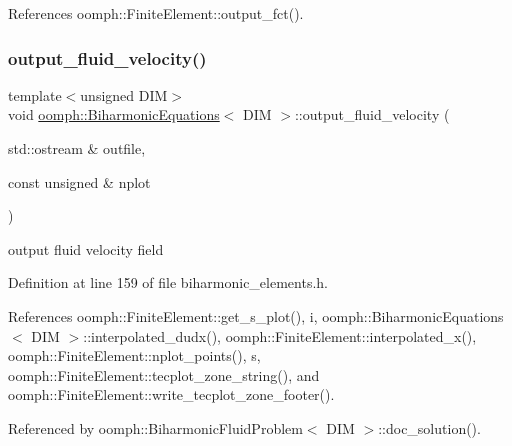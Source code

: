 References oomph\+::\+Finite\+Element\+::output\+\_\+fct().

\mbox{\label{classoomph_1_1BiharmonicEquations_a1aa52e23ab7e609c21d97728e9a8f2ce}} 
\subsubsection{\texorpdfstring{output\+\_\+fluid\+\_\+velocity()}{output\_fluid\_velocity()}}
{\footnotesize\ttfamily template$<$unsigned D\+IM$>$ \\
void \hyperlink{classoomph_1_1BiharmonicEquations}{oomph\+::\+Biharmonic\+Equations}$<$ D\+IM $>$\+::output\+\_\+fluid\+\_\+velocity (\begin{DoxyParamCaption}\item[{std\+::ostream \&}]{outfile,  }\item[{const unsigned \&}]{nplot }\end{DoxyParamCaption})\hspace{0.3cm}{\ttfamily [inline]}}



output fluid velocity field 



Definition at line 159 of file biharmonic\+\_\+elements.\+h.



References oomph\+::\+Finite\+Element\+::get\+\_\+s\+\_\+plot(), i, oomph\+::\+Biharmonic\+Equations$<$ D\+I\+M $>$\+::interpolated\+\_\+dudx(), oomph\+::\+Finite\+Element\+::interpolated\+\_\+x(), oomph\+::\+Finite\+Element\+::nplot\+\_\+points(), s, oomph\+::\+Finite\+Element\+::tecplot\+\_\+zone\+\_\+string(), and oomph\+::\+Finite\+Element\+::write\+\_\+tecplot\+\_\+zone\+\_\+footer().



Referenced by oomph\+::\+Biharmonic\+Fluid\+Problem$<$ D\+I\+M $>$\+::doc\+\_\+solution().

\mbox{\label{classoomph_1_1BiharmonicEquations_a45c5d9248207cb2f3fa584e2b8137d82}} 
